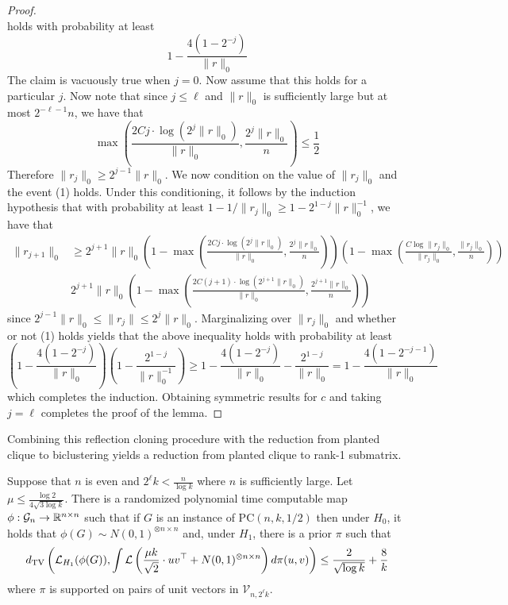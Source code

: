 \documentclass[11pt]{article}
\begin{document}
\begin{proof}
\begin{equation}
\end{equation}
holds with probability at least
$$1 - \frac{4(1 - 2^{-j})}{\| r \|_0}$$
The claim is vacuously true when $j = 0$. Now assume that this holds for a particular $j$. Now note that since $j \le \ell$ and $\| r \|_0$ is sufficiently large but at most $2^{-\ell - 1} n$, we have that
$$\max\left(\frac{2Cj \cdot \log (2^j \| r \|_0)}{\| r \|_0}, \frac{2^j \| r \|_0}{n}\right) \le \frac{1}{2}$$
Therefore $\| r_j \|_0 \ge 2^{j-1} \| r \|_0$. We now condition on the value of $\| r_j \|_0$ and the event (1) holds. Under this conditioning, it follows by the induction hypothesis that with probability at least $1 - 1/\| r_j \|_0 \ge 1 - 2^{1-j} \| r\|_0^{-1}$, we have that
\begin{align*}
\| r_{j+1} \|_0 &\ge 2^{j+1} \| r \|_0 \left( 1 - \max\left(\frac{2Cj \cdot \log (2^j \| r \|_0)}{\| r \|_0}, \frac{2^j \| r \|_0}{n}\right) \right) \left(1 - \max\left(\frac{C \log \| r_j \|_0}{\| r_j\|_0}, \frac{\| r_j \|_0}{n}\right) \right) \\
&2^{j+1} \| r \|_0 \left( 1 - \max\left(\frac{2C(j+1) \cdot \log (2^{j+1} \| r \|_0)}{\| r \|_0}, \frac{2^{j+1} \| r \|_0}{n}\right) \right)
\end{align*}
since $2^{j-1} \| r \|_0 \le \| r_j \| \le 2^j \| r \|_0$. Marginalizing over $\| r_j \|_0$ and whether or not (1) holds yields that the above inequality holds with probability at least
$$\left( 1 - \frac{4(1 - 2^{-j})}{\| r \|_0} \right) \left( 1 - \frac{2^{1-j}}{\| r \|_0^{-1}} \right) \ge 1 - \frac{4(1 - 2^{-j})}{\| r \|_0} - \frac{2^{1-j}}{\| r \|_0} = 1 - \frac{4(1 - 2^{-j-1})}{\| r \|_0}$$
which completes the induction. Obtaining symmetric results for $c$ and taking $j = \ell$ completes the proof of the lemma.
\end{proof}

Combining this reflection cloning procedure with the reduction from planted clique to biclustering yields a reduction from planted clique to rank-1 submatrix.

\begin{lemma}
Suppose that $n$ is even and $2^{\ell} k < \frac{n}{\log k}$ where $n$ is sufficiently large. Let $\mu \le \frac{\log 2}{4 \sqrt{3 \log k}}$. There is a randomized polynomial time computable map $\phi : \mathcal{G}_n \to \mathbb{R}^{n \times n}$ such that if $G$ is an instance of $\text{PC}(n, k, 1/2)$ then under $H_0$, it holds that $\phi(G) \sim N(0, 1)^{\otimes n \times n}$ and, under $H_1$, there is a prior $\pi$ such that
$$d_{\text{TV}}\left( \mathcal{L}_{H_1}(\phi(G)), \int \mathcal{L}\left( \frac{\mu k}{\sqrt{2}} \cdot  uv^\top + N(0, 1)^{\otimes n \times n} \right) d\pi(u, v) \right) \le \frac{2}{\sqrt{\log k}} + \frac{8}{k}$$
where $\pi$ is supported on pairs of unit vectors in $\mathcal{V}_{n, 2^\ell k}$.
\end{lemma}
\end{document}
